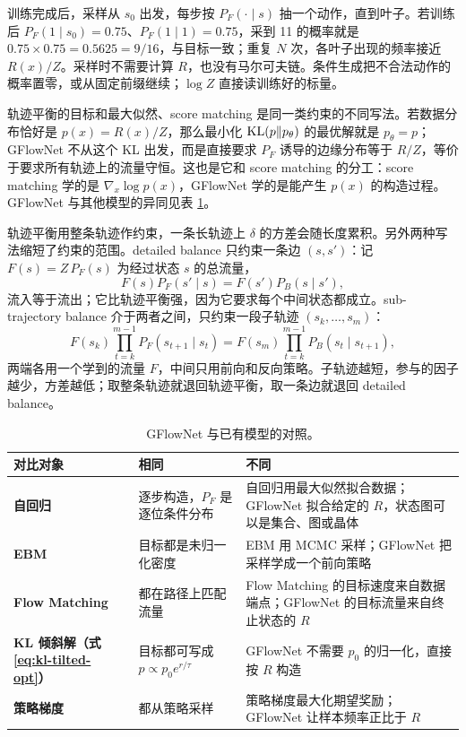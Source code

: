 训练完成后，采样从 \(s_0\) 出发，每步按 \(P_F(\cdot\mid s)\) 抽一个动作，直到叶子。若训练后 \(P_F(1\mid s_0)=0.75\)、\(P_F(1\mid1)=0.75\)，采到 11 的概率就是 \(0.75\times0.75=0.5625=9/16\)，与目标一致；重复 \(N\) 次，各叶子出现的频率接近 \(R(x)/Z\)。采样时不需要计算 \(R\)，也没有马尔可夫链。条件生成把不合法动作的概率置零，或从固定前缀继续；\(\log Z\) 直接读训练好的标量。

轨迹平衡的目标和最大似然、score matching 是同一类约束的不同写法。若数据分布恰好是 \(p(x)=R(x)/Z\)，那么最小化 \(\mathrm{KL}(p\Vert p_\theta)\) 的最优解就是 \(p_\theta=p\)；GFlowNet 不从这个 KL 出发，而是直接要求 \(P_F\) 诱导的边缘分布等于 \(R/Z\)，等价于要求所有轨迹上的流量守恒。这也是它和 score matching 的分工：score matching 学的是 \(\nabla_x\log p(x)\)，GFlowNet 学的是能产生 \(p(x)\) 的构造过程。GFlowNet 与其他模型的异同见表 \ref{tab:gflownet-relations}。

轨迹平衡用整条轨迹作约束，一条长轨迹上 \(\delta\) 的方差会随长度累积。另外两种写法缩短了约束的范围。detailed balance 只约束一条边 \((s,s')\)：记 \(F(s)=Z\,P_F(s)\) 为经过状态 \(s\) 的总流量，
\begin{equation}
 F(s)P_F(s'\mid s)=F(s')P_B(s\mid s'),
\end{equation}
流入等于流出；它比轨迹平衡强，因为它要求每个中间状态都成立。sub-trajectory balance 介于两者之间，只约束一段子轨迹 \((s_k,\ldots,s_m)\)：
\begin{equation}
 F(s_k)\prod_{t=k}^{m-1}P_F(s_{t+1}\mid s_t)=F(s_m)\prod_{t=k}^{m-1}P_B(s_t\mid s_{t+1}),
\end{equation}
两端各用一个学到的流量 \(F\)，中间只用前向和反向策略。子轨迹越短，参与的因子越少，方差越低；取整条轨迹就退回轨迹平衡，取一条边就退回 detailed balance。

\begin{table}[H]
\centering\small
\begin{tabularx}{\textwidth}{>{\bfseries}p{24mm} X X}
\toprule
对比对象 & 相同 & 不同\\
\midrule
自回归 & 逐步构造，\(P_F\) 是逐位条件分布 & 自回归用最大似然拟合数据；GFlowNet 拟合给定的 \(R\)，状态图可以是集合、图或晶体\\
EBM & 目标都是未归一化密度 & EBM 用 MCMC 采样；GFlowNet 把采样学成一个前向策略\\
Flow Matching & 都在路径上匹配流量 & Flow Matching 的目标速度来自数据端点；GFlowNet 的目标流量来自终止状态的 \(R\)\\
KL 倾斜解（式 \eqref{eq:kl-tilted-opt}） & 目标都可写成 \(p\propto p_0e^{r/\tau}\) & GFlowNet 不需要 \(p_0\) 的归一化，直接按 \(R\) 构造\\
策略梯度 & 都从策略采样 & 策略梯度最大化期望奖励；GFlowNet 让样本频率正比于 \(R\)\\
\bottomrule
\end{tabularx}
\caption{GFlowNet 与已有模型的对照。}
\label{tab:gflownet-relations}
\end{table}

